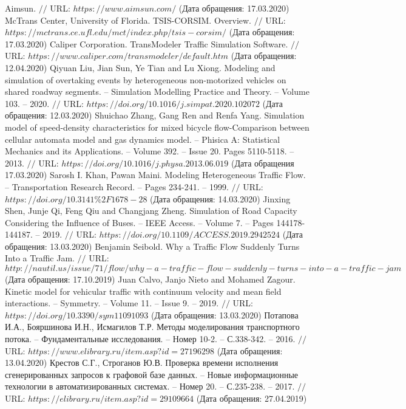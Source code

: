 \begin{thebibliography}{00}
	Aimsun. $//$ URL: $https://www.aimsun.com/$ (Дата обращения: 17.03.2020)
	McTrans Center, University of Florida. TSIS-CORSIM. Overview. $//$ URL: $https://mctrans.ce.ufl.edu/mct/index.php/tsis-corsim/$ (Дата обращения: 17.03.2020)
	Caliper Corporation. TransModeler Traffic Simulation Software. $//$ URL: $https://www.caliper.com/transmodeler/default.htm$ (Дата обращения: 12.04.2020)
	Qiyuan Liu, Jian Sun, Ye Tian and Lu Xiong. Modeling and simulation of overtaking events by heterogeneous non-motorized vehicles on shared roadway segments. -- Simulation Modelling Practice and Theory. -- Volume 103. -- 2020. $//$ URL: $https://doi.org/10.1016/j.simpat.2020.102072$ (Дата обращения: 12.03.2020)
	Shuichao Zhang, Gang Ren and Renfa Yang. Simulation model of speed-density characteristics for mixed bicycle flow-Comparison between cellular automata model and gas dynamics model. -- Phisica A: Statistical Mechanics and its Applications. -- Volume 392. -- Issue 20. Pages 5110-5118. -- 2013. $//$ URL: $https://doi.org/10.1016/j.physa.2013.06.019$ (Дата обращения 17.03.2020)
	Sarosh I. Khan, Pawan Maini. Modeling Heterogeneous Traffic Flow. -- Transportation Research Record. -- Pages 234-241. -- 1999. $//$ URL: $https://doi.org/10.3141\%2F1678-28$ (Дата обращения: 14.03.2020)
	Jinxing Shen, Junje Qi, Feng Qiu and Changjang Zheng. Simulation of Road Capacity Considering the Influence of Buses. -- IEEE Access. -- Volume 7. -- Pages 144178-144187. -- 2019. $//$ URL: $https://doi.org/10.1109/ACCESS.2019.2942524$ (Дата обращения: 13.03.2020)
	Benjamin Seibold. Why a Traffic Flow Suddenly Turns Into a Traffic Jam. $//$ URL: $http://nautil.us/issue/71/flow/why-a-traffic-flow-suddenly-turns-into-a-traffic-jam$ (Дата обращения: 17.10.2019)
	Juan Calvo, Janjo Nieto and Mohamed Zagour. Kinetic model for vehicular traffic with continuum velocity and mean field interactions. -- Symmetry. -- Volume 11. -- Issue 9. -- 2019. $//$ URL: $https://doi.org/10.3390/sym11091093$ (Дата обращения: 13.03.2020)
	Потапова И.А., Бояршинова И.Н., Исмагилов Т.Р. Методы моделирования транспортного потока. --  Фундаментальные исследования. -- Номер 10-2. -- С.338-342. -- 2016. $//$ URL: $https://www.elibrary.ru/item.asp?id=27196298$ (Дата обращения: 13.04.2020)
	Крестов С.Г., Строганов Ю.В. Проверка времени исполнения сгенерированных запросов к графовой базе данных. – Новые информационные технологии в автоматизированных системах. -- Номер 20. -- С.235-238. -- 2017. $//$ URL: $https://elibrary.ru/item.asp?id=29109664$ (Дата обращения: 27.04.2019)

\end{thebibliography}
